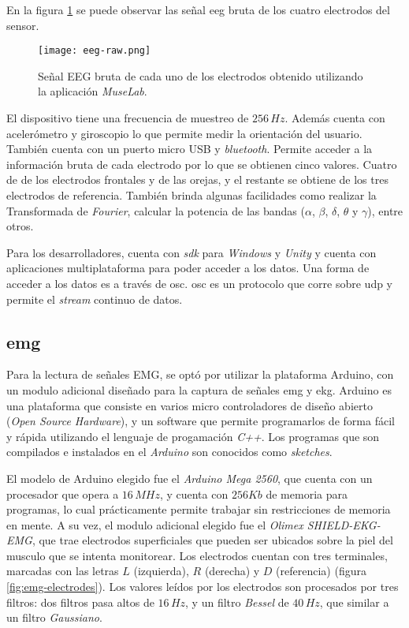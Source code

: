 En la figura \ref{fig:eeg-raw} se puede observar las señal \acrshort{eeg} bruta de los cuatro electrodos del sensor.

\begin{figure}[H]
	\centering
    \texttt{[image: eeg-raw.png]}
    \caption{Señal EEG bruta de cada uno de los electrodos obtenido utilizando la aplicación \emph{MuseLab}.}
	\label{fig:eeg-raw}
\end{figure}

El dispositivo tiene una frecuencia de muestreo de $ 256 \, Hz$. Además cuenta con acelerómetro y giroscopio lo que permite medir la orientación del usuario. También cuenta con un puerto micro USB y \emph{bluetooth}. Permite acceder a la información bruta de cada electrodo por lo que se obtienen cinco valores. Cuatro de de los electrodos frontales y de las orejas, y el restante se obtiene de los tres electrodos de referencia. También brinda algunas facilidades como realizar la Transformada de \emph{Fourier},  calcular la potencia de las bandas ($\alpha$, $\beta$, $\delta$, $\theta$ y $\gamma$), entre otros.

Para los desarrolladores, cuenta con \emph{sdk} para \emph{Windows} y \emph{Unity} y cuenta con aplicaciones multiplataforma para poder acceder a los datos. Una forma de acceder a los datos es a través de \gls{osc}. \acrshort{osc} es un protocolo que corre sobre \acrshort{udp} y permite el \emph{stream} continuo de datos.

\subsection{\acrshort{emg}} \label{emg-hardware}

Para la lectura de señales EMG, se optó por utilizar la plataforma Arduino, con un modulo adicional diseñado para la captura de señales \acrshort{emg} y \acrshort{ekg}.  Arduino es una plataforma que consiste en varios micro controladores de diseño abierto (\emph{Open Source Hardware}), y un software que permite programarlos de forma fácil y rápida utilizando el lenguaje de progamación \emph{C++}. Los programas que son compilados e instalados en el \emph{Arduino} son conocidos como \emph{sketches}.

El modelo de Arduino elegido fue el \emph{Arduino Mega 2560}, que cuenta con un procesador que opera a $16\, MHz$, y cuenta con $256 Kb$ de memoria para programas, lo cual prácticamente permite trabajar sin restricciones de memoria en mente. A su vez, el modulo adicional elegido fue el \emph{Olimex SHIELD-EKG-EMG}, que trae electrodos superficiales que pueden ser ubicados sobre la piel del musculo que se intenta monitorear.  Los electrodos cuentan con tres terminales, marcadas con las letras $L$ (izquierda), $R$ (derecha) y $D$ (referencia) (figura \ref{fig:emg-electrodes}). Los valores leídos por los electrodos son procesados por tres filtros: dos filtros pasa altos de $16\, Hz$, y un filtro \emph{Bessel} de $40\, Hz$, que similar a un filtro \emph{Gaussiano}.


